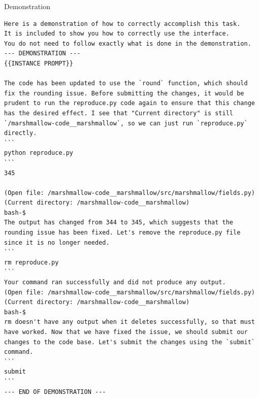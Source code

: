 {
\begin{fileviewerbox}{Demonstration}
\begin{Verbatim}[breaklines=true]
Here is a demonstration of how to correctly accomplish this task.
It is included to show you how to correctly use the interface.
You do not need to follow exactly what is done in the demonstration.
--- DEMONSTRATION ---
{{INSTANCE PROMPT}}

The code has been updated to use the `round` function, which should fix the rounding issue. Before submitting the changes, it would be prudent to run the reproduce.py code again to ensure that this change has the desired effect. I see that "Current directory" is still `/marshmallow-code__marshmallow`, so we can just run `reproduce.py` directly.
```
python reproduce.py
```
345

(Open file: /marshmallow-code__marshmallow/src/marshmallow/fields.py)
(Current directory: /marshmallow-code__marshmallow)
bash-$
The output has changed from 344 to 345, which suggests that the rounding issue has been fixed. Let's remove the reproduce.py file since it is no longer needed.
```
rm reproduce.py
```
Your command ran successfully and did not produce any output.
(Open file: /marshmallow-code__marshmallow/src/marshmallow/fields.py)
(Current directory: /marshmallow-code__marshmallow)
bash-$
rm doesn't have any output when it deletes successfully, so that must have worked. Now that we have fixed the issue, we should submit our changes to the code base. Let's submit the changes using the `submit` command.
```
submit
```
--- END OF DEMONSTRATION ---
\end{Verbatim}
\end{fileviewerbox}
\captionsetup{type=figure}
\label{fig.prompts.demonstration}
}